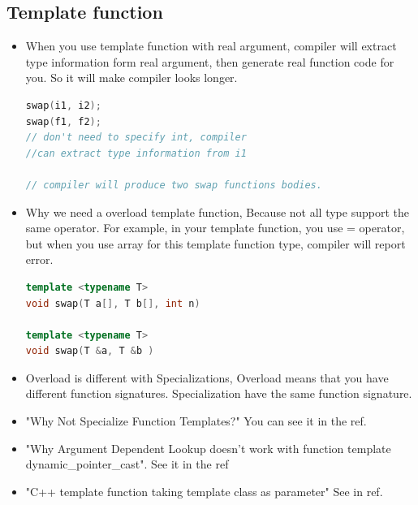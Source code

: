 \documentclass[a4paper,12pt,twoside]{book}
\begin{document}
\subsection{Template function}
\begin{itemize}
\item When you use template function with real argument, compiler will extract type information form real argument, then generate real function code for you.  So it will make compiler looks longer.
\begin{lstlisting}[frame=single, language=c++]
swap(i1, i2);
swap(f1, f2);
// don't need to specify int, compiler
//can extract type information from i1

// compiler will produce two swap functions bodies.
\end{lstlisting}

\item Why we need a overload template function, Because not all type support the same operator. For example, in your template function, you use = operator, but when you use array for this template function type, compiler will report error.
\begin{lstlisting}[frame=single, language=c++]
template <typename T>
void swap(T a[], T b[], int n)

template <typename T>
void swap(T &a, T &b )
\end{lstlisting}

\item Overload is different with Specializations, Overload means that you have different function signatures. Specialization have the same function signature.

\item "Why Not Specialize Function Templates?" You can see it in the ref.

\item "Why Argument Dependent Lookup doesn't work with function template dynamic\_pointer\_cast". See it in the ref

\item "C++ template function taking template class as parameter" See in ref.

\end{itemize}
\end{document}
